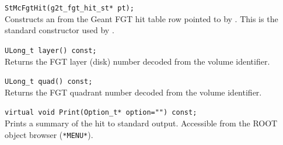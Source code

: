 \begin{Entry}
    \verb+StMcFgtHit(g2t_fgt_hit_st* pt);+\\
    Constructs an  from the Geant FGT hit table row
    pointed to by .  This is the standard constructor used
    by .

\item[Public Member\\ Functions]
    \verb+ULong_t layer() const;+\\
    Returns the FGT layer (disk) number decoded from the volume identifier.

    \verb+ULong_t quad() const;+\\
    Returns the FGT quadrant number decoded from the volume identifier.

    \verb+virtual void Print(Option_t* option="") const;+\\
    Prints a summary of the hit to standard output.  Accessible
    from the ROOT object browser (\verb+*MENU*+).

\end{Entry}
\clearpage
%
%
